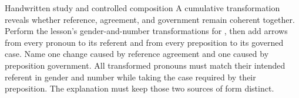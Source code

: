 {  \SubmoduleExtension
    {Handwritten study and controlled composition}
    {A cumulative transformation reveals whether reference, agreement, and government remain coherent together.}
    {Perform the lesson's gender-and-number transformations for , then add arrows from every pronoun to its referent and from every preposition to its governed case.}
    {Name one change caused by reference agreement and one caused by preposition government.}
    {All transformed pronouns must match their intended referent in gender and number while taking the case required by their preposition. The explanation must keep those two sources of form distinct.}
}

